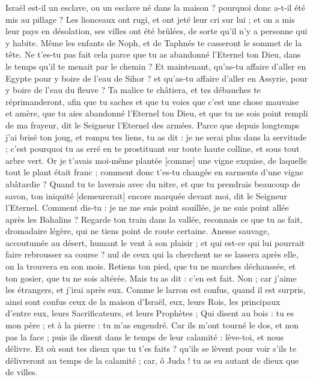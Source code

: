 \begin{multicols}{2}
Israël est-il un esclave, ou un esclave né dans la maison ? pourquoi donc a-t-il été mis au pillage ?
Les lionceaux ont rugi, et ont jeté leur cri sur lui ; et on a mis leur pays en désolation, ses villes ont été brûlées, de sorte qu'il n'y a personne qui y habite.
Même les enfants de Noph, et de Taphnés te casseront le sommet de la tête.
Ne t'es-tu pas fait cela parce que tu as abandonné l'Eternel ton Dieu, dans le temps qu'il te menait par le chemin ?
Et maintenant, qu'as-tu affaire d'aller en Egypte pour y boire de l'eau de Sihor ? et qu'as-tu affaire d'aller en Assyrie, pour y boire de l'eau du fleuve ?
Ta malice te châtiera, et tes débauches te réprimanderont, afin que tu saches et que tu voies que c'est une chose mauvaise et amère, que tu aies abandonné l'Eternel ton Dieu, et que tu ne sois point rempli de ma frayeur, dit le Seigneur l'Eternel des armées.
Parce que depuis longtemps j'ai brisé ton joug, et rompu tes liens, tu as dit : je ne serai plus dans la servitude ; c'est pourquoi tu as erré en te prostituant sur toute haute colline, et sous tout arbre vert.
Or je t'avais moi-même plantée [comme] une vigne exquise, de laquelle tout le plant était franc ; comment donc t'es-tu changée en sarments d'une vigne abâtardie ?
Quand tu te laverais avec du nitre, et que tu prendrais beaucoup de savon, ton iniquité [demeurerait] encore marquée devant moi, dit le Seigneur l'Eternel.
Comment dis-tu : je ne me suis point souillée, je ne suis point allée après les Bahalins ? Regarde ton train dans la vallée, reconnais ce que tu as fait, dromadaire légère, qui ne tiens point de route certaine.
Anesse sauvage, accoutumée au désert, humant le vent à son plaisir ; et qui est-ce qui lui pourrait faire rebrousser sa course ? nul de ceux qui la cherchent ne se lassera après elle, on la trouvera en son mois.
Retiens ton pied, que tu ne marches déchaussée, et ton gosier, que tu ne sois altérée. Mais tu as dit : c'en est fait. Non ; car j'aime les étrangers, et j'irai après eux.
Comme le larron est confus, quand il est surpris, ainsi sont confus ceux de la maison d'Israël, eux, leurs Rois, les principaux d'entre eux, leurs Sacrificateurs, et leurs Prophètes ;
Qui disent au bois : tu es mon père ; et à la pierre : tu m'as engendré. Car ils m'ont tourné le dos, et non pas la face ; puis ils disent dans le temps de leur calamité : lève-toi, et nous délivre.
Et où sont tes dieux que tu t'es faits ? qu'ils se lèvent pour voir s'ils te délivreront au temps de la calamité ; car, ô Juda ! tu as eu autant de dieux que de villes.

\end{multicols}
